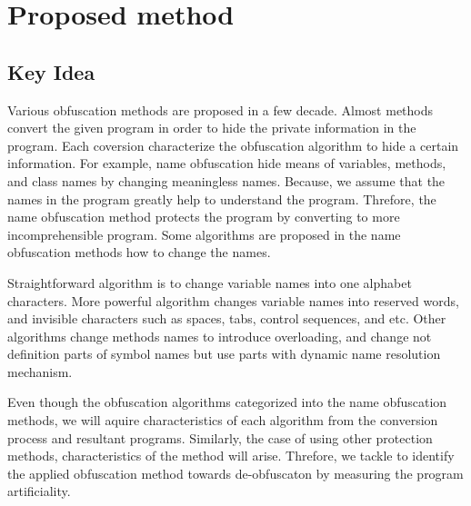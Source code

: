 \documentclass[conference]{IEEEtran}
\begin{document}
\section{Proposed method}

\subsection{Key Idea}

Various obfuscation methods are proposed in a few decade.  Almost
methods convert the given program in order to hide the private
information in the program.  Each coversion characterize the
obfuscation algorithm to hide a certain information.
%
For example, name obfuscation hide means of variables, methods, and
class names by changing meaningless names\cite{tyma00patent}.
Because, we assume that the names in the program greatly help to
understand the program.  Threfore, the name obfuscation method
protects the program by converting to more incomprehensible program.
Some algorithms are proposed in the name obfuscation methods how to
change the names.

Straightforward algorithm is to change variable names into one
alphabet characters.  More powerful algorithm changes variable names
into reserved words, and invisible characters such as spaces, tabs,
control sequences, and etc\cite{dasho}.  Other algorithms change
methods names to introduce overloading\cite{tyma00patent}, and change
not definition parts of symbol names but use parts with dynamic name
resolution mechanism\cite{tamada07ieice}.

Even though the obfuscation algorithms categorized into the name
obfuscation methods, we will aquire characteristics of each algorithm
from the conversion process and resultant programs.
%
Similarly, the case of using other protection methods, characteristics
of the method will arise.
Threfore, we tackle to identify the applied obfuscation method towards
de-obfuscaton by measuring the program artificiality.
\end{document}
